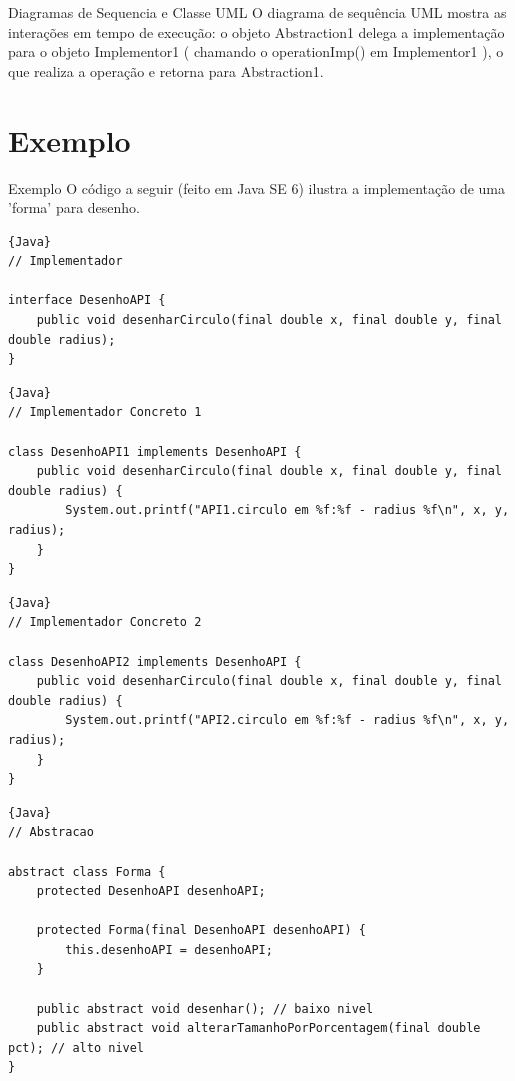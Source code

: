 \documentclass{beamer}
\begin{document}
  \begin{frame}{Diagramas de Sequencia e Classe UML}
O diagrama de sequência UML mostra as interações em tempo de execução: o objeto Abstraction1 delega a implementação para o objeto Implementor1 ( chamando o operationImp() em Implementor1 ), o que realiza a operação e retorna para Abstraction1.
  \end{frame}

  \section{Exemplo}
  \begin{frame}{Exemplo}
O código a seguir (feito em Java SE 6) ilustra a implementação de uma 'forma' para desenho.
  \end{frame}

  \begin{frame}[fragile]
    \begin{lstlisting}{Java}
// Implementador

interface DesenhoAPI {
    public void desenharCirculo(final double x, final double y, final double radius);
}
    \end{lstlisting}
  \end{frame}

  \begin{frame}[fragile]
    \begin{lstlisting}{Java}
// Implementador Concreto 1

class DesenhoAPI1 implements DesenhoAPI {
    public void desenharCirculo(final double x, final double y, final double radius) {
        System.out.printf("API1.circulo em %f:%f - radius %f\n", x, y, radius);
    }
}
    \end{lstlisting}
  \end{frame}
  
  \begin{frame}[fragile]
  \begin{lstlisting}{Java}
// Implementador Concreto 2

class DesenhoAPI2 implements DesenhoAPI {
    public void desenharCirculo(final double x, final double y, final double radius) {
        System.out.printf("API2.circulo em %f:%f - radius %f\n", x, y, radius);
    }
}
    \end{lstlisting}
  \end{frame}

  \begin{frame}[fragile]
  \begin{lstlisting}{Java}
// Abstracao

abstract class Forma {
    protected DesenhoAPI desenhoAPI;
    
    protected Forma(final DesenhoAPI desenhoAPI) {
        this.desenhoAPI = desenhoAPI;
    } 

    public abstract void desenhar(); // baixo nivel
    public abstract void alterarTamanhoPorPorcentagem(final double pct); // alto nivel
}
    \end{lstlisting}
  \end{frame}
\end{document}
